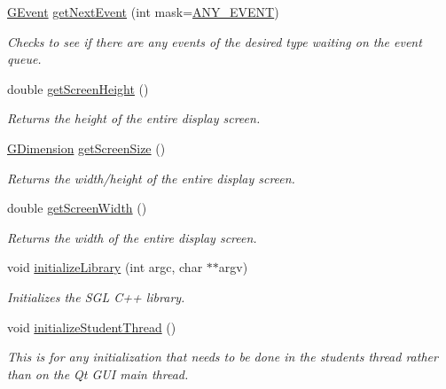 \begin{DoxyCompactItemize}
\mbox{\hyperlink{classsgl_1_1GEvent}{G\+Event}} \mbox{\hyperlink{namespacesgl_a2cc1dab98b5712012e365c8afdc04bc4}{get\+Next\+Event}} (int mask=\mbox{\hyperlink{namespacesgl_a6ff6e8ee75a08092e30167b2b7c5d6f7adb39e2dc0584d3e28dad8abaa4b926b7}{A\+N\+Y\+\_\+\+E\+V\+E\+NT}})
\begin{DoxyCompactList}\small\item\em Checks to see if there are any events of the desired type waiting on the event queue. \end{DoxyCompactList}\item 
double \mbox{\hyperlink{namespacesgl_a9942379fdf4fb4445c35eaf3390b7ccb}{get\+Screen\+Height}} ()
\begin{DoxyCompactList}\small\item\em Returns the height of the entire display screen. \end{DoxyCompactList}\item 
\mbox{\hyperlink{structsgl_1_1GDimension}{G\+Dimension}} \mbox{\hyperlink{namespacesgl_ae3d08d5cde8163274459797770596809}{get\+Screen\+Size}} ()
\begin{DoxyCompactList}\small\item\em Returns the width/height of the entire display screen. \end{DoxyCompactList}\item 
double \mbox{\hyperlink{namespacesgl_adc82933bd579ab83d7cd4e3bc5f79a12}{get\+Screen\+Width}} ()
\begin{DoxyCompactList}\small\item\em Returns the width of the entire display screen. \end{DoxyCompactList}\item 
void \mbox{\hyperlink{namespacesgl_ab36f2e19ed11765f2b025cc8e4636010}{initialize\+Library}} (int argc, char $\ast$$\ast$argv)
\begin{DoxyCompactList}\small\item\em Initializes the S\+GL C++ library. \end{DoxyCompactList}\item 
void \mbox{\hyperlink{namespacesgl_aa826ed0038c35ea532e22c6c0a4e6036}{initialize\+Student\+Thread}} ()
\begin{DoxyCompactList}\small\item\em This is for any initialization that needs to be done in the student\textquotesingle{}s thread rather than on the Qt G\+UI main thread. \end{DoxyCompactList}\item 
$$
\end{DoxyCompactItemize}
